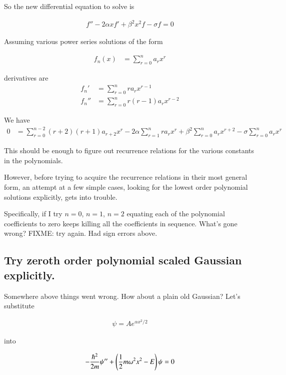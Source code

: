 So the new differential equation to solve is

\begin{align}
f'' - 2 \alpha x f' + \beta^2 x^2 f - \sigma f = 0
\end{align}

Assuming various power series solutions of the form

\begin{align*}
f_n(x) &= \sum_{r=0}^n a_r x^r
\end{align*}

derivatives are
\begin{align*}
f_n' &= \sum_{r=0}^n r a_r x^{r-1} \\
f_n'' &= \sum_{r=0}^n r(r-1) a_r x^{r-2}
\end{align*}

We have 
\begin{align*}
0 &= \sum_{r=0}^{n-2} (r+2)(r+1) a_{r+2} x^{r}
 - 2 \alpha \sum_{r=1}^n r a_r x^{r}
+ \beta^2
\sum_{r=0}^n a_r x^{r+2} 
- \sigma \sum_{r=0}^n a_r x^r
\end{align*}

This should be enough to figure out recurrence relations for the various constants in the polynomials.

However, before trying to acquire the recurrence relations in their most general form, an attempt at a few simple cases, looking for the lowest order
polynomial solutions explicitly, gets into trouble.

Specifically, if I try $n=0$, $n=1$, $n=2$ equating each of the polynomial coefficients to zero keeps killing all the coefficients in sequence.  What's 
gone wrong?  FIXME: try again.  Had sign errors above.

\subsection{Try zeroth order polynomial scaled Gaussian explicitly. }

Somewhere above things went wrong.  How about a plain old Gaussian?  Let's substitute 

\begin{align*}
\psi = A e^{\alpha x^2/2}
\end{align*}

into 

\begin{align*}
-\frac{\hbar^2}{2m} \psi'' + \left( \frac{1}{2}m \omega^2 x^2 - E \right) \psi = 0
\end{align*}

